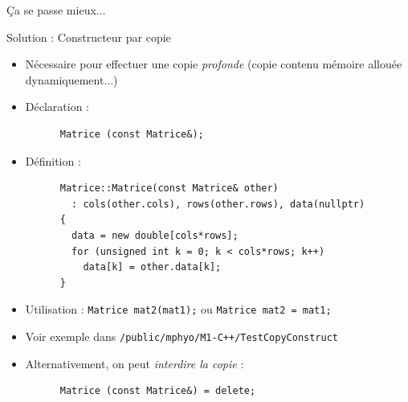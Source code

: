 \documentclass[c]{beamer}
\begin{document}
\begin{frame}[fragile]{Ça se passe mieux...}
\end{frame}


\begin{frame}[fragile]{Solution : Constructeur par copie}
  \begin{itemize}
  \item Nécessaire pour effectuer une copie \emph{profonde} (copie contenu mémoire allouée dynamiquement...)
  \item Déclaration :
    \begin{verbatim}
      Matrice (const Matrice&);
    \end{verbatim}
  \item Définition :
    \begin{verbatim}
      Matrice::Matrice(const Matrice& other)
        : cols(other.cols), rows(other.rows), data(nullptr)
      {
        data = new double[cols*rows];
        for (unsigned int k = 0; k < cols*rows; k++)
          data[k] = other.data[k];   
      }
    \end{verbatim}
    \item Utilisation : \texttt{Matrice mat2(mat1);} ou \texttt{Matrice mat2 = mat1;}
    \item Voir exemple dans \texttt{/public/mphyo/M1-C++/TestCopyConstruct}
    \item Alternativement, on peut \emph{interdire la copie} :
    \begin{verbatim}
      Matrice (const Matrice&) = delete;
    \end{verbatim}
  \end{itemize}
\end{frame}
\end{document}
